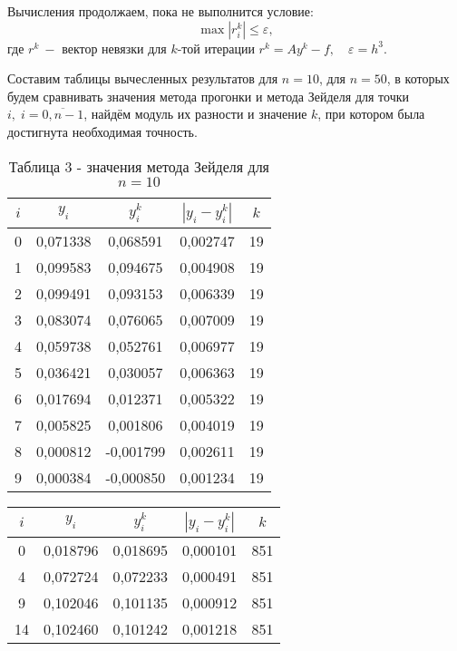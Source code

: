 \documentclass[a4paper,12pt]{article}
\begin{document}
{Вычисления продолжаем, пока не выполнится условие:
$$\max\limits |r_i^k| \leq \varepsilon,$$
где $r^k ~-$ вектор невязки для $k$-той итерации $r^k=Ay^k-f, \quad \varepsilon=h^3.$

Составим таблицы вычесленных результатов для $n = 10$, для $n = 50$, 
в которых будем сравнивать значения метода прогонки и метода Зейделя для точки $i,\; i = \overline{0, n - 1}$, 
найдём модуль их разности и значение $k$, при котором была достигнута необходимая точность.
\begin{table}[h]
    \centering
    \begin{tabular}{|c|c|c|c|c|}
        \hline
        $i$ & $y_i$ & $y_i^k$ & $\left|y_i - y_i^k\right|$ & $k$\\
        \hline
        0 &  0,071338 &  0,068591 &  0,002747 & 19 \\ \hline
        1 &  0,099583 &  0,094675 &  0,004908 & 19 \\ \hline
        2 &  0,099491 &  0,093153 &  0,006339 & 19 \\ \hline
        3 &  0,083074 &  0,076065 &  0,007009 & 19 \\ \hline
        4 &  0,059738 &  0,052761 &  0,006977 & 19 \\ \hline
        5 &  0,036421 &  0,030057 &  0,006363 & 19 \\ \hline
        6 &  0,017694 &  0,012371 &  0,005322 & 19 \\ \hline
        7 &  0,005825 &  0,001806 &  0,004019 & 19 \\ \hline
        8 &  0,000812 & -0,001799 &  0,002611 & 19 \\ \hline
        9 &  0,000384 & -0,000850 &  0,001234 & 19 \\ \hline
    \end{tabular}
    \caption*{\small{Таблица 3 - значения метода Зейделя для $n = 10$}}
\end{table}
\begin{table}[h]
    \centering
    \begin{tabular}{|c|c|c|c|c|}
        \hline
        $i$ & $y_i$ & $y_i^k$ & $\left|y_i - y_i^k\right|$ & $k$\\
        \hline
        0 &  0,018796 &  0,018695 &  0,000101 & 851 \\ \hline
        4 &  0,072724 &  0,072233 &  0,000491 & 851 \\ \hline
        9 &  0,102046 &  0,101135 &  0,000912 & 851 \\ \hline
       14 &  0,102460 &  0,101242 &  0,001218 & 851 \\ \hline

\end{tabular}
\end{table}}
\end{document}
